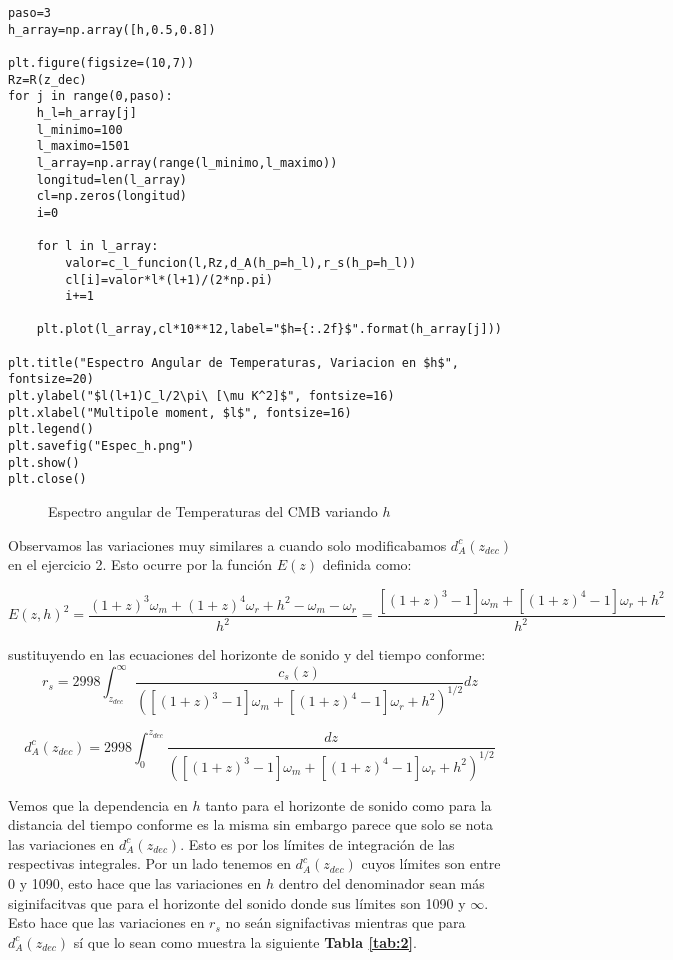 \documentclass{article}
\begin{document}
\begin{lstlisting}[style=Python]
paso=3
h_array=np.array([h,0.5,0.8])

plt.figure(figsize=(10,7))
Rz=R(z_dec)
for j in range(0,paso):
    h_l=h_array[j]    
    l_minimo=100
    l_maximo=1501
    l_array=np.array(range(l_minimo,l_maximo))
    longitud=len(l_array)
    cl=np.zeros(longitud)
    i=0    
    
    for l in l_array:
        valor=c_l_funcion(l,Rz,d_A(h_p=h_l),r_s(h_p=h_l))
        cl[i]=valor*l*(l+1)/(2*np.pi)
        i+=1
    
    plt.plot(l_array,cl*10**12,label="$h={:.2f}$".format(h_array[j]))

plt.title("Espectro Angular de Temperaturas, Variacion en $h$", fontsize=20)
plt.ylabel("$l(l+1)C_l/2\pi\ [\mu K^2]$", fontsize=16)
plt.xlabel("Multipole moment, $l$", fontsize=16)
plt.legend()
plt.savefig("Espec_h.png")
plt.show()
plt.close()
\end{lstlisting}

\begin{figure}[h]
    \begin{center}
    \end{center}
\caption{\label{fig:5} Espectro angular de Temperaturas del CMB variando $h$}
\end{figure}

Observamos las variaciones muy similares a cuando solo modificabamos $d_A^c(z_{dec})$ en el ejercicio 2. Esto ocurre por la función $E(z)$ definida como:

$$
E(z,h)^2=\frac{(1+z)^3\omega_m+(1+z)^4\omega_r+h^2-\omega_m-\omega_r}{h^2}=\frac{[(1+z)^3-1]\omega_m+[(1+z)^4-1]\omega_r+h^2}{h^2}
$$

sustituyendo en las ecuaciones del horizonte de sonido y del tiempo conforme:
$$
r_s=2998\int_{z_{dec}}^\infty \frac{c_s(z)}{([(1+z)^3-1]\omega_m+[(1+z)^4-1]\omega_r+h^2)^{1/2}}dz
$$

$$
d_A^c(z_{dec})=2998\int_0^{z_{dec}} \frac{dz}{([(1+z)^3-1]\omega_m+[(1+z)^4-1]\omega_r+h^2)^{1/2}}
$$

Vemos que la dependencia en $h$ tanto para el horizonte de sonido como para la distancia del tiempo conforme es la misma sin embargo parece que solo se nota las variaciones en $d_A^c(z_{dec})$. Esto es por los límites de integración de las respectivas integrales. Por un lado tenemos en $d_A^c(z_{dec})$ cuyos límites son entre 0 y 1090, esto hace que las variaciones en $h$ dentro del denominador sean más siginifacitvas que para el horizonte del sonido donde sus límites son 1090 y $\infty$. Esto hace que las variaciones en $r_s$ no seán signifactivas mientras que para $d_A^c(z_{dec})$ sí que lo sean como muestra la siguiente \textbf{Tabla \ref{tab:2}}.
\end{document}
